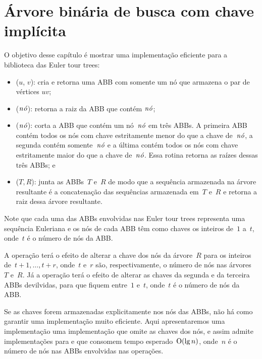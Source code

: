 \chapter{Árvore binária de busca com chave implícita}
\label{sec:TreapDeChaveImplicita}

O objetivo desse capítulo é mostrar uma implementação eficiente para a biblioteca das Euler tour trees:
\begin{itemize}
\item  \treapCreate($u$, $v$): cria e retorna uma ABB com somente um nó que armazena o par de vértices $uv$;
\item \treapGetRoot($\mathit{n\acute{o}}$): retorna a raiz da ABB que contém $\mathit{n\acute{o}}$;
\item \treapSplit($\mathit{n\acute{o}}$): corta a ABB que contém um nó~$\mathit{n\acute{o}}$ em três ABBs. A primeira ABB contém todos os nós com chave estritamente menor do que a chave de~$\mathit{n\acute{o}}$, a segunda contém somente~$\mathit{n\acute{o}}$ e a última contém todos os nós com chave estritamente maior do que a chave de~$\mathit{n\acute{o}}$. Essa rotina retorna as raízes dessas três ABBs; e
\item \treapJoin($T, R$): junta as ABBs~$T$ e~$R$ de modo que a sequência armazenada na árvore resultante é a concatenação das sequências armazenada em~$T$ e~$R$ e retorna a raiz dessa árvore resultante.
\end{itemize}

Note que cada uma das ABBs envolvidas nas Euler tour trees representa uma sequência Euleriana e os nós de cada ABB têm como chaves os inteiros de~$1$ a~$t$, onde~$t$ é o número de nós da ABB.

A operação \treapJoin{} terá o efeito de alterar a chave dos nós da árvore~$R$ para os inteiros de~$t+1,\ldots,t+r$, onde~$t$ e~$r$ são, respectivamente, o número de nós nas árvores~$T$ e~$R$.
Já a operação \treapSplit{} terá o efeito de alterar as chaves da segunda e da terceira ABBs devilvidas, para que fiquem entre~$1$ e~$t$, onde~$t$ é o número de nós da ABB.

Se as chaves forem armazenadas explicitamente nos nós das ABBs, não há como garantir uma implementação muito eficiente.
Aqui apresentaremos uma implementação uma implementação que omite as chaves dos nós, e assim admite implementações para \treapJoin{} e \treapSplit{} que consomem tempo esperado~$\mathrm{O}(\lg n)$, onde~$n$ é o número de nós nas ABBs envolvidas nas operações.

